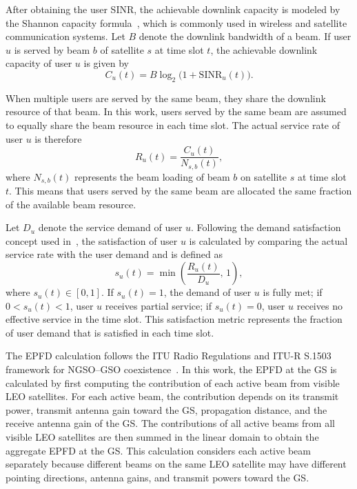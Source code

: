 After obtaining the user SINR, the achievable downlink capacity is modeled by the Shannon capacity formula~\cite{shannon1948}, which is commonly used in wireless and satellite communication systems. Let $B$ denote the downlink bandwidth of a beam. If user $u$ is served by beam $b$ of satellite $s$ at time slot $t$, the achievable downlink capacity of user $u$ is given by
\begin{equation*}
C_u(t)=B\log_2\!\bigl(1+\mathrm{SINR}_u(t)\bigr).
\end{equation*}

When multiple users are served by the same beam, they share the downlink resource of that beam. In this work, users served by the same beam are assumed to equally share the beam resource in each time slot. The actual service rate of user $u$ is therefore
\begin{equation}
R_u(t)=\frac{C_u(t)}{N_{s,b}(t)},
\label{eq:ch3_service_rate}
\end{equation}
where $N_{s,b}(t)$ represents the beam loading of beam $b$ on satellite $s$ at time slot $t$. This means that users served by the same beam are allocated the same fraction of the available beam resource.

Let $D_u$ denote the service demand of user $u$. Following the demand satisfaction concept used in~\cite{jalali2023joint}, the satisfaction of user $u$ is calculated by comparing the actual service rate with the user demand and is defined as
\begin{equation}
s_u(t)=\min\!\left(\frac{R_u(t)}{D_u},\,1\right),
\label{eq:ch3_satisfaction}
\end{equation}
where $s_u(t)\in[0,1]$. If $s_u(t)=1$, the demand of user $u$ is fully met; if $0<s_u(t)<1$, user $u$ receives partial service; if $s_u(t)=0$, user $u$ receives no effective service in the time slot. This satisfaction metric represents the fraction of user demand that is satisfied in each time slot.

The EPFD calculation follows the ITU Radio Regulations and ITU-R S.1503 framework for NGSO--GSO coexistence~\cite{itur_rr2020,itur_s1503_2018}. In this work, the EPFD at the GS is calculated by first computing the contribution of each active beam from visible LEO satellites. For each active beam, the contribution depends on its transmit power, transmit antenna gain toward the GS, propagation distance, and the receive antenna gain of the GS. The contributions of all active beams from all visible LEO satellites are then summed in the linear domain to obtain the aggregate EPFD at the GS. This calculation considers each active beam separately because different beams on the same LEO satellite may have different pointing directions, antenna gains, and transmit powers toward the GS.

